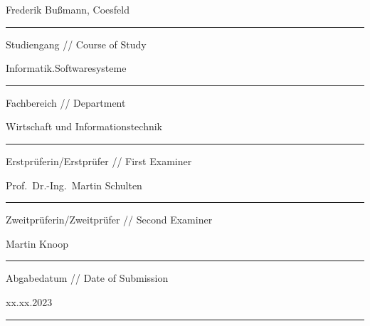 \begin{titlepage}
        \vskip 0.03cm

        \begingroup
        \fontsize{12pt}{14pt}\selectfont
        Frederik Bußmann, Coesfeld
        \endgroup

        \vskip -0.05cm

        \noindent\rule{14.4cm}{0.4pt}

        \vskip 0.13cm

        \begingroup
        \fontsize{8pt}{6pt}\selectfont
        Studiengang // Course of Study
        \endgroup

        \vskip 0.03cm

        \begingroup
        \fontsize{12pt}{14pt}\selectfont
        Informatik.Softwaresysteme
        \endgroup

        \vskip -0.05cm

        \noindent\rule{14.4cm}{0.4pt}

        \vskip 0.13cm

        \begingroup
        \fontsize{8pt}{6pt}\selectfont
        Fachbereich // Department
        \endgroup

        \vskip 0.03cm

        \begingroup
        \fontsize{12pt}{14pt}\selectfont
        Wirtschaft und Informationstechnik
        \endgroup

        \vskip -0.05cm

        \noindent\rule{14.4cm}{0.4pt}

        \vskip 0.13cm

        \begingroup
        \fontsize{8pt}{6pt}\selectfont
        Erstprüferin/Erstprüfer // First Examiner
        \endgroup

        \vskip 0.03cm

        \begingroup
        \fontsize{12pt}{14pt}\selectfont
        Prof.\ Dr.-Ing.\ Martin Schulten
        \endgroup

        \vskip -0.05cm

        \noindent\rule{14.4cm}{0.4pt}

        \vskip 0.13cm

        \begingroup
        \fontsize{8pt}{6pt}\selectfont
        Zweitprüferin/Zweitprüfer // Second Examiner
        \endgroup

        \vskip 0.03cm

        \begingroup
        \fontsize{12pt}{14pt}\selectfont
        Martin Knoop
        \endgroup

        \vskip -0.05cm

        \noindent\rule{14.4cm}{0.4pt}

        \vskip 0.13cm

        \begingroup
        \fontsize{8pt}{6pt}\selectfont
        Abgabedatum // Date of Submission
        \endgroup

        \vskip 0.03cm

        \begingroup
        \fontsize{12pt}{14pt}\selectfont
        xx.xx.2023
        \endgroup

        \vskip -0.05cm

        \noindent\rule{14.4cm}{0.4pt}
    \restoregeometry
\end{titlepage}
\clearpage
